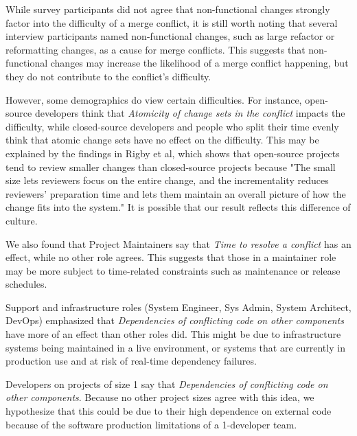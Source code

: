 While survey participants did not agree that non-functional changes strongly factor into the difficulty of a merge conflict, it is still worth noting that several interview participants named non-functional changes, such as large refactor or reformatting changes, as a cause for merge conflicts. This suggests that non-functional changes may increase the likelihood of a merge conflict happening, but they do not contribute to the conflict's difficulty.

However, some demographics do view certain difficulties. For instance, open-source developers think that \textit{Atomicity of change sets in the conflict} impacts the difficulty, while closed-source developers and people who split their time evenly think that atomic change sets have no effect on the difficulty. This may be explained by the findings in Rigby et al\cite{OSS_smaller_commits}, which shows that open-source projects tend to review smaller changes than closed-source projects because "The small size lets reviewers focus on the entire change, and the incrementality reduces reviewers’ preparation time and lets them maintain an overall picture of how the change fits into the system." It is possible that our result reflects this difference of culture.

We also found that Project Maintainers say that \textit{Time to resolve a conflict} has an effect, while no other role agrees. This suggests that those in a maintainer role may be more subject to time-related constraints such as maintenance or release schedules. 


Support and infrastructure roles (System Engineer, Sys Admin, System Architect, DevOps) emphasized that \textit{Dependencies of conflicting code on other components} have more of an effect than other roles did. This might be due to infrastructure systems being maintained in a live environment, or systems that are currently in production use and at risk of real-time dependency failures. 

Developers on projects of size 1 say that \textit{Dependencies of conflicting code on other components}. Because no other project sizes agree with this idea, we hypothesize that this could be due to their high dependence on external code because of the software production limitations of a 1-developer team.

